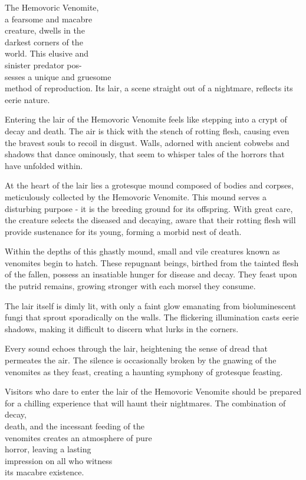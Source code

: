 \documentclass[letterpaper,openany,twoside,twocolumn]{book}
\begin{document}

The Hemovoric Venomite,\\a fearsome and macabre\\creature, dwells in the\\darkest corners of the\\world. This elusive and\\sinister predator pos-\\sesses a unique and gruesome\\method of reproduction. Its lair, a scene straight out of a nightmare, reflects its eerie nature.

Entering the lair of the Hemovoric Venomite feels like stepping into a crypt of decay and death. The air is thick with the stench of rotting flesh, causing even the bravest souls to recoil in disgust. Walls, adorned with ancient cobwebs and shadows that dance ominously, that seem to whisper tales of the horrors that have unfolded within.

At the heart of the lair lies a grotesque mound composed of bodies and corpses, meticulously collected by the Hemovoric Venomite. This mound serves a disturbing purpose - it is the breeding ground for its offspring. With great care, the creature selects the diseased and decaying, aware that their rotting flesh will provide sustenance for its young, forming a morbid nest of death.

Within the depths of this ghastly mound, small and vile creatures known as venomites begin to hatch. These repugnant beings, birthed from the tainted flesh of the fallen, possess an insatiable hunger for disease and decay. They feast upon the putrid remains, growing stronger with each morsel they consume.

The lair itself is dimly lit, with only a faint glow emanating from bioluminescent fungi that sprout sporadically on the walls. The flickering illumination casts eerie shadows, making it difficult to discern what lurks in the corners.

Every sound echoes through the lair, heightening the sense of dread that permeates the air. The silence is occasionally broken by the gnawing of the venomites as they feast, creating a haunting symphony of grotesque feasting.

\newcommand{\blocktextlinebreak}{~~~~~~~~~~~~~~~~~~~\vspace*{-1.2\fontdimen6\font}\\}
Visitors who dare to enter the lair of the Hemovoric Venomite should be prepared for a chilling experience that will haunt their nightmares. The combination of decay, \blocktextlinebreak\hspace*{1.75cm}death, and the incessant feeding of the \blocktextlinebreak\hspace*{2.5cm}venomites creates an atmosphere of pure \blocktextlinebreak\hspace*{4cm} horror, leaving a lasting \blocktextlinebreak\hspace*{4.5cm} impression on all who witness \blocktextlinebreak\hspace*{5cm} its macabre existence. \blocktextlinebreak
\end{document}
